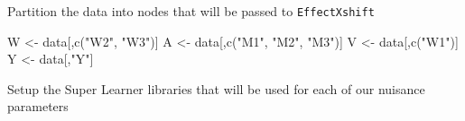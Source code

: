 \documentclass[
]{article}
\newenvironment{Shaded}{\begin{snugshade}}{\end{snugshade}}
\newcommand{\FunctionTok}[1]{\textcolor[rgb]{0.00,0.00,0.00}{#1}}
\newcommand{\NormalTok}[1]{#1}
\newcommand{\OtherTok}[1]{\textcolor[rgb]{0.56,0.35,0.01}{#1}}
\newcommand{\SpecialCharTok}[1]{\textcolor[rgb]{0.00,0.00,0.00}{#1}}
\newcommand{\StringTok}[1]{\textcolor[rgb]{0.31,0.60,0.02}{#1}}
\begin{document}
\begin{Shaded}
\end{Shaded}

Partition the data into nodes that will be passed to \texttt{EffectXshift}

\begin{Shaded}
\begin{Highlighting}[]

\NormalTok{W }\OtherTok{\textless{}{-}}\NormalTok{ data[,}\FunctionTok{c}\NormalTok{(}\StringTok{"W2"}\NormalTok{, }\StringTok{"W3"}\NormalTok{)]}
\NormalTok{A }\OtherTok{\textless{}{-}}\NormalTok{ data[,}\FunctionTok{c}\NormalTok{(}\StringTok{"M1"}\NormalTok{, }\StringTok{"M2"}\NormalTok{, }\StringTok{"M3"}\NormalTok{)]}
\NormalTok{V }\OtherTok{\textless{}{-}}\NormalTok{ data[,}\FunctionTok{c}\NormalTok{(}\StringTok{"W1"}\NormalTok{)]}
\NormalTok{Y }\OtherTok{\textless{}{-}}\NormalTok{ data[,}\StringTok{"Y"}\NormalTok{]}
\end{Highlighting}
\end{Shaded}

Setup the Super Learner libraries that will be used for each of our
nuisance parameters
\end{document}
